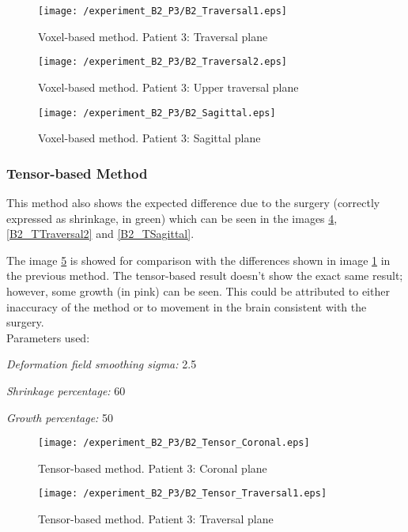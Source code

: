 \begin{figure}[H]
  \centering
  \texttt{[image: /experiment\_B2\_P3/B2\_Traversal1.eps]}
  \caption{Voxel-based method. Patient 3: Traversal plane}
  \label{B2_Traversal1}
\end{figure}

\begin{figure}[H]
  \centering
  \texttt{[image: /experiment\_B2\_P3/B2\_Traversal2.eps]}
  \caption{Voxel-based method. Patient 3: Upper traversal plane}
  \label{B2_Traversal2}
\end{figure}

\begin{figure}[H]
  \centering
  \texttt{[image: /experiment\_B2\_P3/B2\_Sagittal.eps]}
  \caption{Voxel-based method. Patient 3: Sagittal plane}
  \label{B2_Sagittal}
\end{figure}


\subsubsection{Tensor-based Method}
This method also shows the expected difference due to the surgery
(correctly expressed as shrinkage, in green) which can be seen in the
images \ref{B2_TCoronal}, \ref{B2_TTraversal2} and \ref{B2_TSagittal}.

The image \ref{B2_TTraversal1} is showed for comparison with the
differences shown in image \ref{B2_Traversal1} in the previous
method. The tensor-based result doesn't show the exact same result;
however, some growth (in pink) can be seen. This could be attributed
to either inaccuracy of the method or to movement in the brain
consistent with the surgery.\\

Parameters used:
\begin{description}
\item \textit{Deformation field smoothing sigma:} 2.5
\item \textit{Shrinkage percentage:} 60
\item \textit{Growth percentage:} 50
\end{description}

\begin{figure}[H]
  \centering
  \texttt{[image: /experiment\_B2\_P3/B2\_Tensor\_Coronal.eps]}
  \caption{Tensor-based method. Patient 3: Coronal plane}
  \label{B2_TCoronal}
\end{figure}

\begin{figure}[H]
  \centering
  \texttt{[image: /experiment\_B2\_P3/B2\_Tensor\_Traversal1.eps]}
  \caption{Tensor-based method. Patient 3: Traversal plane}
  \label{B2_TTraversal1}
\end{figure}

